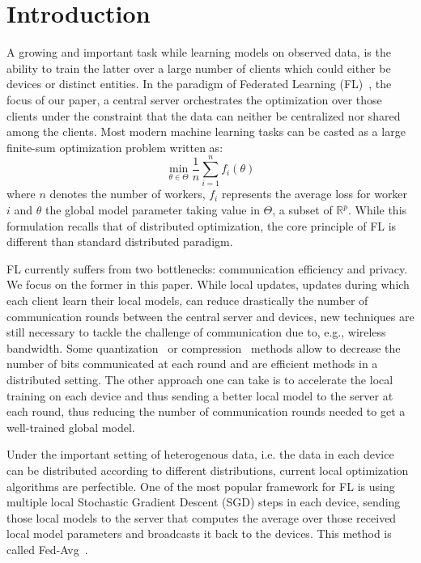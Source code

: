 \documentclass[11pt]{article}
\begin{document}
\vspace{-0.1in}
\section{Introduction}\label{sec:introduction}

A growing and important task while learning models on observed data, is the ability to train the latter over a large number of clients which could either be devices or distinct entities.
In the paradigm of Federated Learning (FL)~\citep{konevcny2016federated,mcmahan2017communication}, the focus of our paper, a central server orchestrates the optimization over those clients under the constraint that the data can neither be centralized nor shared among the clients.
Most modern machine learning tasks can be casted as a large finite-sum optimization problem written as:
\begin{equation}\label{eq:opt}
\min \limits_{\theta \in \Theta} \frac{1}{n} \sum_{i=1}^n f_i(\theta)
\end{equation}
where $n$ denotes the number of workers, $f_i$ represents the average loss for worker $i$ and $\theta$ the global model parameter taking value in $\Theta$, a subset of $\mathbb{R}^p$.
While this formulation recalls that of distributed optimization, the core principle of FL is different than standard distributed paradigm.

FL currently suffers from two bottlenecks: communication efficiency and privacy.
We focus on the former in this paper.
While local updates, updates during which each client learn their local models, can reduce drastically the number of communication rounds between the central server and devices, new techniques are still necessary to tackle the  challenge of communication due to, e.g., wireless bandwidth.
Some quantization~\citep{alistarh2017qsgd, wangni2018gradient} or compression~\citep{lin2017deep} methods allow to decrease the number of bits communicated at each round and are efficient methods in a distributed setting.
The other approach one can take is to accelerate the local training on each device and thus sending a better local model to the server at each round, thus reducing the number of communication rounds needed to get a well-trained global model.

Under the important setting of heterogenous data, i.e. the data in each device can be distributed according to different distributions, current local optimization algorithms are perfectible.
One of the most popular framework for FL is using multiple local Stochastic Gradient Descent (SGD) steps in each device, sending those local models to the server that computes the average over those received local model parameters and broadcasts it back to the devices. This method is called Fed-Avg~\citep{mcmahan2017communication}.
\end{document}
